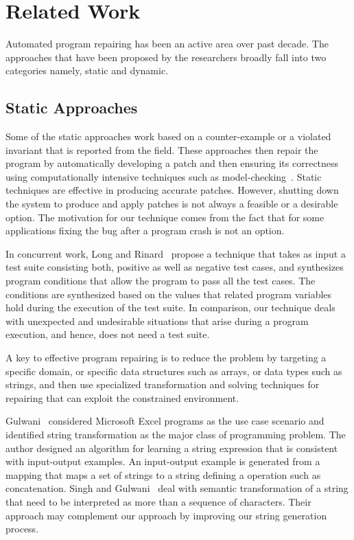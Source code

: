 \section{Related Work}
\label{sec:relatedWork}


Automated program repairing has been an active area over past decade. The
approaches that have been proposed by the researchers broadly fall into two
categories namely, static and dynamic.

\subsection{Static Approaches}

 Some of the static approaches work based on
a counter-example or a violated invariant that is reported from the field. These
approaches then repair the program by automatically developing a patch and then
ensuring its correctness using computationally intensive techniques such as
model-checking~\cite{biere2014, wei-issta-2010}. Static techniques are effective
in producing accurate patches. However, shutting down the system to produce and
apply patches is not always a feasible or a desirable option. The motivation for
our technique comes from the fact that for some applications fixing the bug
after a program crash is not an option.

In concurrent work, Long and Rinard~\cite{SPR} propose a technique that takes as
input a test suite consisting both, positive as well as negative test cases, and
synthesizes program conditions that allow the program to pass all the test
cases. The conditions are synthesized based on the values that related program
variables hold during the execution of the test suite. In comparison, our
technique deals with unexpected and undesirable situations that arise during a
program execution, and hence, does not need a test suite.

 A key to effective program repairing is to
reduce the problem by targeting a specific domain, or specific data structures
such as arrays, or data types such as strings, and then use specialized
transformation and solving techniques for repairing that can exploit the
constrained environment.

Gulwani~\cite{Gulwani:2011} considered Microsoft Excel programs as the use case
scenario and identified string transformation as the major class of programming
problem. The author designed an algorithm for learning a string expression that
is consistent with input-output examples. An input-output example is generated
from a mapping that maps a set of strings to a string defining a operation such
as concatenation. Singh and Gulwani~\cite{Singh:2012} deal with semantic
transformation of a string that need to be interpreted as more than a sequence
of characters. Their approach may complement our approach by improving our
string generation process.

